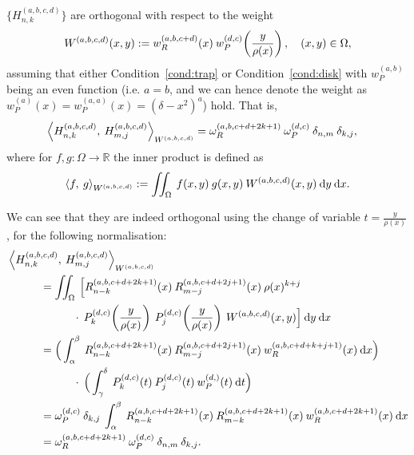 \documentclass[11pt, oneside]{article}   	%
\newcommand{\R}{\mathbb{R}}
\newcommand{\hdop}{H}
\newcommand{\hdopnk}{\hdop_{n,k}}
\newcommand{\hdopmj}{\hdop_{m,j}}
\newcommand{\jac}{{P}}
\newcommand{\genjac}{R}
\newcommand{\genjacnmk}{\genjac_{n-k}}
\newcommand{\genjacmmj}{\genjac_{m-j}}
\newcommand{\genjacw}{w_\genjac}
\newcommand{\jacw}{w_P}
\newcommand{\normgenjac}{\omega_\genjac}
\newcommand{\normjac}{\omega_P}
\newcommand{\hdopnkabcd}{\hdop_{n,k}^{(a,b,c,d)}}
\newcommand{\Wabcd}{{W^{(a,b,c,d)}}}
\newcommand{\hdopmjabcd}{\hdop_{m,j}^{(a,b,c,d)}}
\def\condref#1{Condition~\ref{cond:#1}}
\begin{document}
$\{\hdopnk^{(a,b,c,d)}\}$ are orthogonal with respect to the weight
\begin{align*}
	W^{(a,b,c,d)}(x,y) := \genjacw^{(a,b,c+d)}(x) \: \jacw^{(d,c)}\fpr(\frac{y}{\rho(x)}), \quad (x,y) \in \Omega,
\end{align*}
assuming that either \condref{trap} or \condref{disk} with  \(\jacw^{(a,b)}\) being an even function (i.e. $a = b$, and we can hence denote the weight as $\jacw^{(a)}(x) = w^{(a,a)}_P(x) =  (\delta-x^2)^a$) hold.
That is,
\begin{align*}
	\ip< \hdopnk^{(a,b,c,d)}, \: \hdopmj^{(a,b,c,d)} >_{W^{(a,b,c,d)}} &= \normgenjac^{(a,b,c+d+2k+1)} \: \normjac^{(d,c)} \: \delta_{n,m} \: \delta_{k,j},
\end{align*}
where for $f, g : \Omega \to \R$ the inner product is defined as 
\begin{align*}
	\ip< f, \: g >_{W^{(a,b,c,d)}} := \iint_\Omega \: f(x,y) \: g(x,y) \: W^{(a,b,c,d)}(x,y) \: \D y \: \D x.
\end{align*}

We can see that they are indeed orthogonal using the change of variable $t = \frac{y}{\rho(x)}$, for the following normalisation:
\begin{align}
	&\ip< \hdopnkabcd, \: \hdopmjabcd >_\Wabcd \\
	&\quad \quad \quad =  \iint_\Omega \: \Big[ \genjacnmk^{(a,b,c+d+2k+1)}(x) \: \genjacmmj^{(a,b,c+d+2j+1)}(x) \: \rho(x)^{k+j}  \nonumber \\
		&\quad \quad \quad \quad \quad \quad \cdot \: \jac_k^{(d,c)}\fpr(\frac{y}{\rho(x)}) \: \jac_j^{(d,c)}\fpr(\frac{y}{\rho(x)})  \: \Wabcd(x,y) \Big] \: \D y \: \D x \nonumber \\
	&\quad \quad \quad = \Big( \int_\alpha^\beta \: {\genjacnmk^{(a,b,c+d+2k+1)}}(x) \: {\genjacmmj^{(a,b,c+d+2j+1)}}(x) \: \genjacw^{(a,b,c+d+k+j+1)}(x) \: \D x \Big) \nonumber \\
	&\quad \quad \quad \quad \quad \quad \cdot \: \Big( \int_\gamma^\delta \: {\jac_k^{(d,c)}}(t) \:  {\jac_j^{(d,c)}}(t) \: \jacw^{(d,)}(t) \: \D t \Big) \nonumber \\
	&\quad \quad \quad = \normjac^{(d,c)} \: \delta_{k,j} \: \int_\alpha^\beta \: {\genjacnmk^{(a,b,c+d+2k+1)}}(x) \: {\genjac_{m-k}^{(a,b,c+d+2k+1)}}(x) \: \genjacw^{(a,b,c+d+2k+1)}(x) \: \D x \nonumber \\ 
	&\quad \quad \quad = \normgenjac^{(a,b,c+d+2k+1)} \: \normjac^{(d,c)} \: \delta_{n,m} \: \delta_{k,j}. \label{eqn:normhdop}
\end{align}
\end{document}
